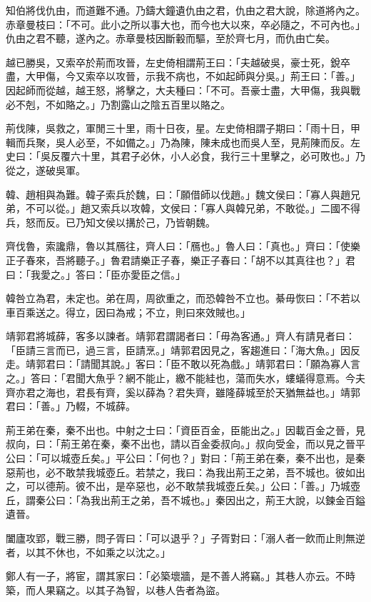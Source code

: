 \begin{pinyinscope}
知伯將伐仇由，而道難不通。乃鑄大鐘遺仇由之君，仇由之君大說，除道將內之。赤章曼枝曰：「不可。此小之所以事大也，而今也大以來，卒必隨之，不可內也。」仇由之君不聽，遂內之。赤章曼枝因斷轂而驅，至於齊七月，而仇由亡矣。

越已勝吳，又索卒於荊而攻晉，左史倚相謂荊王曰：「夫越破吳，豪士死，銳卒盡，大甲傷，今又索卒以攻晉，示我不病也，不如起師與分吳。」荊王曰：「善。」因起師而從越，越王怒，將擊之，大夫種曰：「不可。吾豪士盡，大甲傷，我與戰必不剋，不如賂之。」乃割露山之陰五百里以賂之。

荊伐陳，吳救之，軍閒三十里，雨十日夜，星。左史倚相謂子期曰：「雨十日，甲輯而兵聚，吳人必至，不如備之。」乃為陳，陳未成也而吳人至，見荊陳而反。左史曰：「吳反覆六十里，其君子必休，小人必食，我行三十里擊之，必可敗也。」乃從之，遂破吳軍。

韓、趙相與為難。韓子索兵於魏，曰：「願借師以伐趙。」魏文侯曰：「寡人與趙兄弟，不可以從。」趙又索兵以攻韓，文侯曰：「寡人與韓兄弟，不敢從。」二國不得兵，怒而反。已乃知文侯以搆於己，乃皆朝魏。

齊伐魯，索讒鼎，魯以其鴈往，齊人曰：「鴈也。」魯人曰：「真也。」齊曰：「使樂正子春來，吾將聽子。」魯君請樂正子春，樂正子春曰：「胡不以其真往也？」君曰：「我愛之。」答曰：「臣亦愛臣之信。」

韓咎立為君，未定也。弟在周，周欲重之，而恐韓咎不立也。綦毋恢曰：「不若以車百乘送之。得立，因曰為戒；不立，則曰來效賊也。」

靖郭君將城薛，客多以諫者。靖郭君謂謁者曰：「毋為客通。」齊人有請見者曰：「臣請三言而已，過三言，臣請烹。」靖郭君因見之，客趨進曰：「海大魚。」因反走。靖郭君曰：「請聞其說。」客曰：「臣不敢以死為戲。」靖郭君曰：「願為寡人言之。」答曰：「君聞大魚乎？網不能止，繳不能絓也，蕩而失水，螻蟻得意焉。今夫齊亦君之海也，君長有齊，奚以薛為？君失齊，雖隆薛城至於天猶無益也。」靖郭君曰：「善。」乃輟，不城薛。

荊王弟在秦，秦不出也。中射之士曰：「資臣百金，臣能出之。」因載百金之晉，見叔向，曰：「荊王弟在秦，秦不出也，請以百金委叔向。」叔向受金，而以見之晉平公曰：「可以城壺丘矣。」平公曰：「何也？」對曰：「荊王弟在秦，秦不出也，是秦惡荊也，必不敢禁我城壺丘。若禁之，我曰：為我出荊王之弟，吾不城也。彼如出之，可以德荊。彼不出，是卒惡也，必不敢禁我城壺丘矣。」公曰：「善。」乃城壺丘，謂秦公曰：「為我出荊王之弟，吾不城也。」秦因出之，荊王大說，以鍊金百鎰遺晉。

闔廬攻郢，戰三勝，問子胥曰：「可以退乎？」子胥對曰：「溺人者一飲而止則無逆者，以其不休也，不如乘之以沈之。」

鄭人有一子，將宦，謂其家曰：「必築壞牆，是不善人將竊。」其巷人亦云。不時築，而人果竊之。以其子為智，以巷人告者為盜。


\end{pinyinscope}
